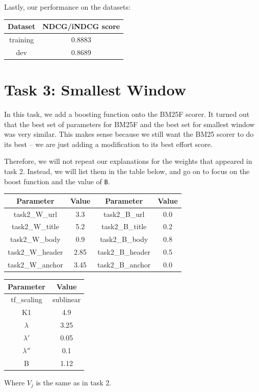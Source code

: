 \documentclass[10pt,twocolumn]{article}
\begin{document}
Lastly, our performance on the datasets:
\begin{table}[H]
\centering
\begin{tabular}{|c|c|}
\hline
Dataset & NDCG/iNDCG score \\\hline
training & 0.8883\\\hline
dev & 0.8689\\\hline
\end{tabular}
\end{table}
\section*{Task 3: Smallest Window}
In this task, we add a boosting function onto the BM25F scorer. It turned out that the best set of parameters for BM25F and the best set for smallest window was very similar. This makes sense because we still want the BM25 scorer to do its best -- we are just adding a modification to its best effort score. 

Therefore, we will not repeat our explanations for the weights that appeared in task 2. Instead, we will list them in the table below, and go on to focus on the boost function and the value of \texttt{B}.
\begin{table}[H]
\centering
\begin{tabular}{|c|c|c|c|}
\hline
Parameter & Value & Parameter & Value\\\hline
task2\_W\_url & 3.3 & task2\_B\_url & 0.0\\\hline
task2\_W\_title & 5.2 & task2\_B\_title & 0.2\\\hline
task2\_W\_body & 0.9 & task2\_B\_body & 0.8\\\hline
task2\_W\_header & 2.85 & task2\_B\_header & 0.5 \\\hline
task2\_W\_anchor & 3.45 & task2\_B\_anchor & 0.0\\\hline
\end{tabular}
\end{table}
\begin{table}[H]
\centering
\begin{tabular}{|c|c|}
\hline
Parameter & Value\\\hline
tf\_scaling & sublinear\\\hline
K1 & 4.9\\\hline
$\lambda$ & 3.25\\\hline
$\lambda'$ & 0.05\\\hline
$\lambda''$ & 0.1\\\hline
B & 1.12\\\hline
\end{tabular}
\end{table}
Where $V_j$ is the same as in task 2.
\end{document}
